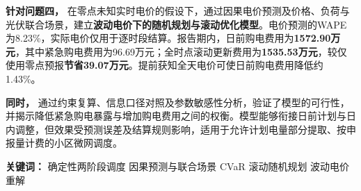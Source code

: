 \textbf{针对问题四，}
在零点未知实时电价的假设下，通过因果电价预测及价格、负荷与光伏联合场景，建立\textbf{波动电价下的随机规划与滚动优化模型}。电价预测的WAPE为8.23\%，实际电价仅用于逐时段结算。报告期内，日前购电费用为\textbf{1572.90万元}，其中紧急购电费用为96.69万元；全时点滚动更新费用为\textbf{1535.53万元}，较仅使用零点预报\textbf{节省39.07万元}。提前获知全天电价可使日前购电费用降低约1.43\%。

\textbf{同时，}
通过约束复算、信息口径对照及参数敏感性分析，验证了模型的可行性，并揭示降低紧急购电暴露与增加购电费用之间的权衡。模型能够衔接日前计划与日内调整，但效果受预测误差及结算规则影响，适用于允许计划电量部分提取、按申报量计费的小区微网调度。

\vspace{8pt}

\noindent
\textbf{关键词：}
确定性两阶段调度\quad
因果预测与联合场景\quad
CVaR 滚动随机规划\quad
波动电价重解


\clearpage
